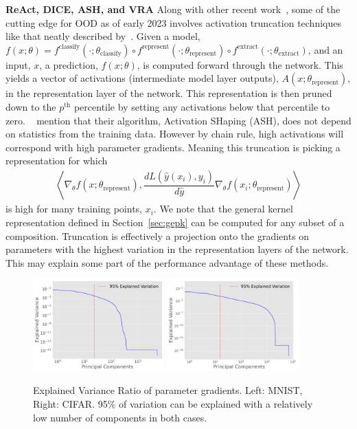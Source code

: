 \textbf{ReAct, DICE, ASH, and VRA}
Along with other recent work~\citep{sun2021, sun2022, xu2023vra}, some of the cutting edge for OOD as of early 2023 involves activation truncation techniques like that neatly described by~\citet{djurisic2023extremely}. 
Given a model, $f(x; \theta) = f^{\text{classify}}(\cdot; \theta_{\text{classify}}) \circ f^{\text{represent}}(\cdot; \theta_{\text{represent}}) \circ f^{\text{extract}}(\cdot; \theta_{\text{extract}})$, and an input, $x$, a prediction, $f(x; \theta)$, is computed forward through the network. 
This yields a vector of activations (intermediate model layer outputs), $A(x; \theta_{\text{represent}})$, in the representation layer of the network. 
This representation is then pruned down to the $p^{\text{th}}$
percentile by setting any activations below that percentile to
zero. ~\citet{djurisic2023extremely} mention that their algorithm,
Activation SHaping (ASH), does not depend on statistics from the
training data. However by chain rule, high activations will correspond with high parameter gradients. 
Meaning this truncation is picking a representation for which
\begin{align}
  \left\langle \nabla_\theta f(x; \theta_{\text{represent}}),
  \dfrac{dL(\hat y(x_i), y_i)}{d\hat y} \nabla_\theta f(x_i;
  \theta_{\text{represent}}) \right\rangle
\end{align}
is high for many training points, $x_i$. We note that the
general kernel representation defined in Section~\ref{sec:gepk} can be
computed for any subset of a composition. Truncation is effectively a
projection onto the gradients on parameters with
the highest variation in the representation layers of the network. 
This may explain some part of the performance advantage of these methods. 

\begin{figure}[t]
    \centering
    \includegraphics[width=0.45\textwidth]{c4a_figures/explained_variance_ratio.pdf}
    \includegraphics[width=0.45\textwidth]{c4a_figures/explained_variance_ratio_cifar.pdf}
    \caption{Explained Variance Ratio of parameter gradients. Left: MNIST, Right: CIFAR. 95\% of variation can be explained with a relatively low number of components in both cases.}
    \label{fig:rank}
\end{figure}

